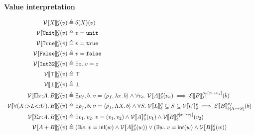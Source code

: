 \begin{figure}[p]
\small
\noindent\textbf{Value interpretation} \hfill {}

\vspace{0.5em}
\begin{math}
\begin{array}{r@{\;}c@{\;}l}
  \mathcal{V}\llbracket X \rrbracket_{\delta}^{\rho}(v) &\triangleq& \delta(X)(v)
  \\[0.5em]
  \mathcal{V}\llbracket \texttt{Unit} \rrbracket_{\delta}^{\rho}(v) &\triangleq& v = \texttt{unit}
  \\[0.5em]
  \mathcal{V}\llbracket \texttt{True} \rrbracket_{\delta}^{\rho}(v) &\triangleq& v = \texttt{true}
  \\[0.5em]
  \mathcal{V}\llbracket \texttt{False} \rrbracket_{\delta}^{\rho}(v) &\triangleq& v = \texttt{false}
  \\[0.5em]
  \mathcal{V}\llbracket \texttt{Int32} \rrbracket_{\delta}^{\rho}(v) &\triangleq& \exists z.\; v = z
  \\[0.5em]
  \mathcal{V}\llbracket \top \rrbracket_{\delta}^{\rho}(v) &\triangleq& \top
  \\[0.5em]
  \mathcal{V}\llbracket \bot \rrbracket_{\delta}^{\rho}(v) &\triangleq& \bot
  \\[0.5em]
  \mathcal{V}\llbracket \Pi x{:}A.\, B \rrbracket_{\delta}^{\rho}(v) &\triangleq&
    \exists \rho_f, b.\; v = \langle \rho_f, \lambda x.\, b \rangle \land \forall v_a.\; \mathcal{V}\llbracket A \rrbracket_{\delta}^{\rho}(v_a) \implies \mathcal{E}\llbracket B \rrbracket_{\delta}^{\rho_f[x \mapsto v_a]}(b)
  \\[0.5em]
  \mathcal{V}\llbracket \forall (X {:>} L {<:} U).\, B \rrbracket_{\delta}^{\rho}(v) &\triangleq&
    \exists \rho_f, b.\; v = \langle \rho_f, \Lambda X.\, b \rangle \land \forall S.\; \mathcal{V}\llbracket L \rrbracket_{\delta}^{\rho} \subseteq S \subseteq \mathcal{V}\llbracket U \rrbracket_{\delta}^{\rho} \implies \mathcal{E}\llbracket B \rrbracket_{\delta[X \mapsto S]}^{\rho_f}(b)
  \\[0.5em]
  \mathcal{V}\llbracket \Sigma x{:}A.\, B \rrbracket_{\delta}^{\rho}(v) &\triangleq&
    \exists v_1, v_2.\; v = (v_1, v_2) \land \mathcal{V}\llbracket A \rrbracket_{\delta}^{\rho}(v_1) \land \mathcal{V}\llbracket B \rrbracket_{\delta}^{\rho[x \mapsto v_1]}(v_2)
  \\[0.5em]
  \mathcal{V}\llbracket A + B \rrbracket_{\delta}^{\rho}(v) &\triangleq&
    (\exists w.\; v = \textsf{inl}(w) \land \mathcal{V}\llbracket A \rrbracket_{\delta}^{\rho}(w)) \lor (\exists w.\; v = \textsf{inr}(w) \land \mathcal{V}\llbracket B \rrbracket_{\delta}^{\rho}(w))

\end{array}
\end{math}
\end{figure}
